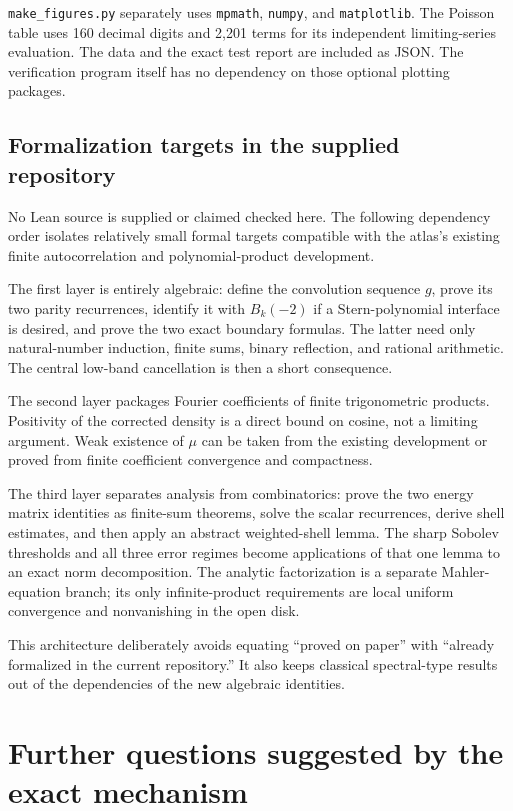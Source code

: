 \documentclass[11pt,a4paper,oneside,openany]{book}
\numberwithin{equation}{chapter}
\theoremstyle{definition}
\theoremstyle{remark}
\begin{document}
\texttt{make\_figures.py} separately uses \texttt{mpmath}, \texttt{numpy}, and
\texttt{matplotlib}. The Poisson table uses 160 decimal digits and 2,201 terms
for its independent limiting-series evaluation. The data and the exact test
report are included as JSON. The verification program itself has no dependency
on those optional plotting packages.

\section{Formalization targets in the supplied repository}
No Lean source is supplied or claimed checked here. The following dependency
order isolates relatively small formal targets compatible with the atlas's
existing finite autocorrelation and polynomial-product development.

The first layer is entirely algebraic: define the convolution sequence $g$, prove
its two parity recurrences, identify it with $B_k(-2)$ if a Stern-polynomial
interface is desired, and prove the two exact boundary formulas. The latter
need only natural-number induction, finite sums, binary reflection, and rational
arithmetic. The central low-band cancellation is then a short consequence.

The second layer packages Fourier coefficients of finite trigonometric products.
Positivity of the corrected density is a direct bound on cosine, not a limiting
argument. Weak existence of $\mu$ can be taken from the existing development or
proved from finite coefficient convergence and compactness.

The third layer separates analysis from combinatorics: prove the two energy
matrix identities as finite-sum theorems, solve the scalar recurrences, derive
shell estimates, and then apply an abstract weighted-shell lemma. The sharp
Sobolev thresholds and all three error regimes become applications of that one
lemma to an exact norm decomposition. The analytic factorization is a separate
Mahler-equation branch; its only infinite-product requirements are local uniform
convergence and nonvanishing in the open disk.

This architecture deliberately avoids equating ``proved on paper'' with
``already formalized in the current repository.'' It also keeps classical
spectral-type results out of the dependencies of the new algebraic identities.
\chapter{Further questions suggested by the exact mechanism}
\label{bc:sec:questions}
\end{document}
